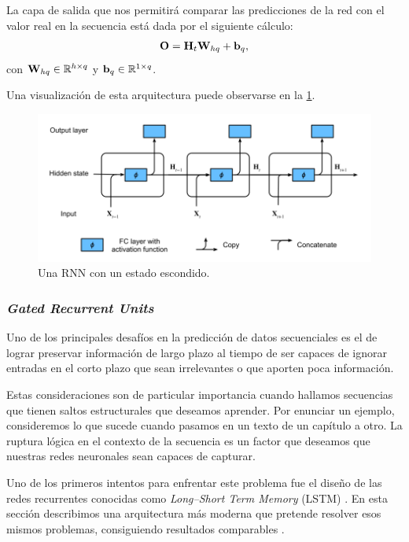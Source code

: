 \documentclass[12pt]{article}
\newcommand{\R}{\mathbb{R}}
\newcommand{\hi}{\bm{\textbf H}}
\newcommand{\we}{\bm{\textbf W}}
\newcommand{\bi}{\bm{\textbf b}}
\newcommand{\out}{\bm{\textbf O}}
\begin{document}
La capa de salida que nos permitirá comparar las predicciones de la red con el valor real en la secuencia está dada por el siguiente cálculo:
\begin{equation}
    \out = \hi_t \we_{hq} + \bi_q,
\end{equation}
con $ \we_{hq} \in \R^{h \times q} $ y $ \bi_q \in \R^{1 \times q} $.

Una visualización de esta arquitectura puede observarse en la \cref{fig:rnn}.

\begin{figure}
    \centering
    \includegraphics[width=0.8\linewidth]{images/rnn}
    \caption{Una RNN con un estado escondido.}
    \label{fig:rnn}
\end{figure}



\subsubsection{\textit{Gated Recurrent Units}}

Uno de los principales desafíos en la predicción de datos secuenciales es el de lograr preservar información de largo plazo al tiempo de ser capaces de ignorar entradas en el corto plazo que sean irrelevantes o que aporten poca información.

Estas consideraciones son de particular importancia cuando hallamos secuencias que tienen saltos estructurales que deseamos aprender. Por enunciar un ejemplo, consideremos lo que sucede cuando pasamos en un texto de un capítulo a otro. La ruptura lógica en el contexto de la secuencia es un factor que deseamos que nuestras redes neuronales sean capaces de capturar.

Uno de los primeros intentos para enfrentar este problema fue el diseño de las redes recurrentes conocidas como \textit{Long--Short Term Memory} (LSTM) \parencite{Hochreiter1997}. En esta sección describimos una arquitectura más moderna que pretende resolver esos mismos problemas, consiguiendo resultados comparables \parencite{Chung2014}.
\end{document}
